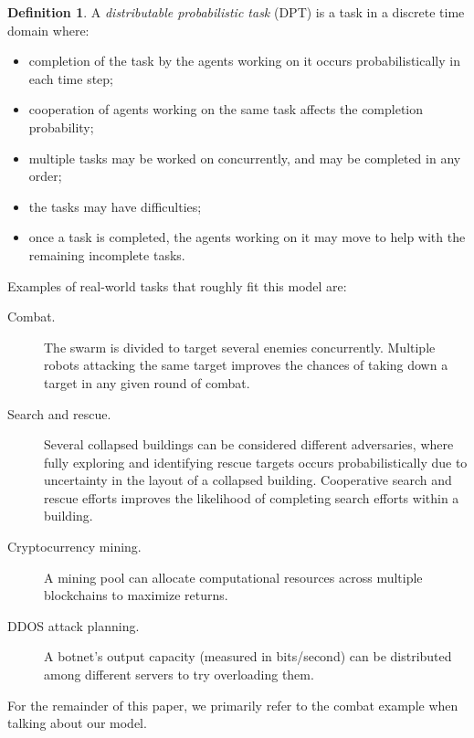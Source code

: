 \documentclass[11pt]{article}
\theoremstyle{definition}
\newtheorem{defn}{Definition}
\begin{document}
\begin{defn}
    A \emph{distributable probabilistic task} (DPT) is a task in a discrete
    time domain where:
    \begin{itemize}
        \item
            completion of the task by the agents working on it occurs
            probabilistically in each time step;
        \item
            cooperation of agents working on the same task affects the
            completion probability;
        \item
            multiple tasks may be worked on concurrently, and may be completed
            in any order;
        \item
            the tasks may have difficulties;
        \item
            once a task is completed, the agents working on it may move to help
            with the remaining incomplete tasks.
    \end{itemize}
\end{defn}

Examples of real-world tasks that roughly fit this model are:
%
\begin{description}
    \item[Combat.]
        The swarm is divided to target several enemies concurrently.
        Multiple robots attacking the same target improves the chances of
        taking down a target in any given round of combat.
    \item[Search and rescue.]
        Several collapsed buildings can be considered different adversaries,
        where fully exploring and identifying rescue targets occurs
        probabilistically due to uncertainty in the layout of a collapsed
        building.
        Cooperative search and rescue efforts improves the likelihood of
        completing search efforts within a building.
    \item[Cryptocurrency mining.]
        A mining pool can allocate computational resources across multiple
        blockchains to maximize returns.
    \item[DDOS attack planning.]
        A botnet's output capacity (measured in bits/second) can be distributed
        among different servers to try overloading them.
\end{description}

For the remainder of this paper, we primarily refer to the combat example when
talking about our model.
\end{document}

